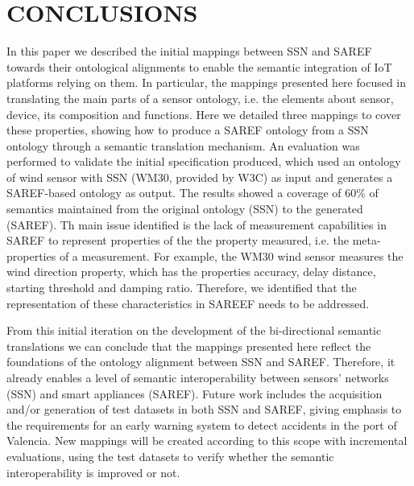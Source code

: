 \documentclass{sig-alternate-05-2015}
\begin{document}
\section{CONCLUSIONS}

In this paper we described the initial mappings between SSN and SAREF towards their ontological alignments to enable the semantic integration of IoT platforms relying on them. In particular, the mappings presented here focused in translating the main parts of a sensor ontology, i.e. the elements about sensor, device, its composition and functions. Here we detailed three mappings to cover these properties, showing how to produce a SAREF ontology from a SSN ontology through a semantic translation mechanism. An evaluation was performed to validate the initial specification produced, which used an ontology of wind sensor with SSN (WM30, provided by W3C) as input and generates a SAREF-based ontology as output. The results showed a coverage of 60\% of semantics maintained from the original ontology (SSN) to the generated (SAREF). Th main issue identified is the lack of measurement capabilities in SAREF to represent properties of the the property measured, i.e. the meta-properties of a measurement. For example, the WM30 wind sensor measures the wind direction property, which has the properties accuracy, delay distance, starting threshold and damping ratio. Therefore, we identified that the representation of these characteristics in SAREEF needs to be addressed.

From this initial iteration on the development of the bi-directional semantic translations we can conclude that the mappings presented here reflect the foundations of the ontology alignment between SSN and SAREF. Therefore, it already enables a level of semantic interoperability between sensors' networks (SSN) and smart appliances (SAREF). Future work includes the acquisition and/or generation of test datasets in both SSN and SAREF, giving emphasis to the requirements for an early warning system \cite{Moreira2017} to detect accidents in the port of Valencia. New mappings will be created according to this scope with incremental evaluations, using the test datasets to verify whether the semantic interoperability is improved or not.  



%

%
%
\end{document}
